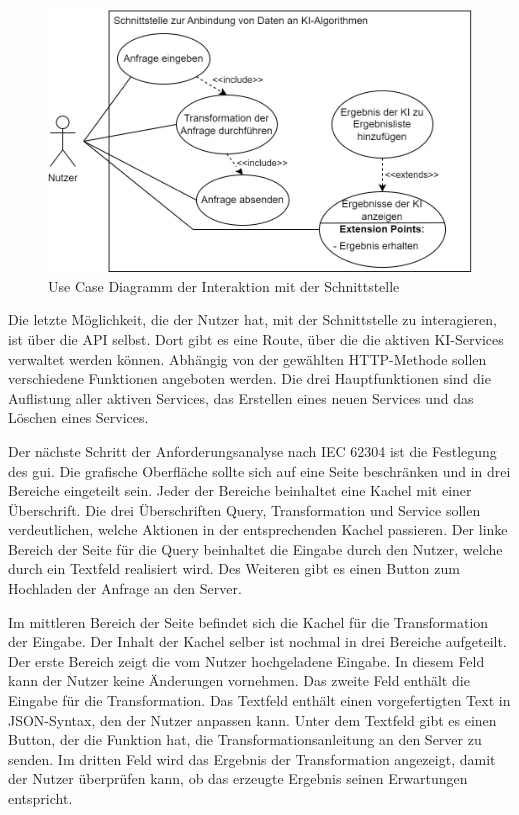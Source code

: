 \begin{figure}[H]
  \centering
    \includegraphics[width = 15cm]{bilder/UseCase}
    \caption{Use Case Diagramm der Interaktion mit der Schnittstelle}
\end{figure}

Die letzte Möglichkeit, die der Nutzer hat, mit der Schnittstelle zu interagieren, ist über die API selbst. Dort gibt es eine Route, über die die aktiven KI-Services verwaltet werden können. Abhängig von der gewählten HTTP-Methode sollen verschiedene Funktionen angeboten werden. Die drei Hauptfunktionen sind die Auflistung aller aktiven Services, das Erstellen eines neuen Services und das Löschen eines Services.

Der nächste Schritt der Anforderungsanalyse nach IEC 62304 ist die Festlegung des \ac{gui}. Die grafische Oberfläche sollte sich auf eine Seite beschränken und in drei Bereiche eingeteilt sein. Jeder der Bereiche beinhaltet eine Kachel mit einer Überschrift. Die drei Überschriften \glqq Query\grqq{}, \glqq Transformation\grqq{} und \glqq Service\grqq{} sollen verdeutlichen, welche Aktionen in der entsprechenden Kachel passieren.
Der linke Bereich der Seite für die Query beinhaltet die Eingabe durch den Nutzer, welche durch ein Textfeld realisiert wird. Des Weiteren gibt es einen Button zum Hochladen der Anfrage an den Server.

Im mittleren Bereich der Seite befindet sich die Kachel für die Transformation der Eingabe. Der Inhalt der Kachel selber ist nochmal in drei Bereiche aufgeteilt. Der erste Bereich zeigt die vom Nutzer hochgeladene Eingabe. In diesem Feld kann der Nutzer keine Änderungen vornehmen. Das zweite Feld enthält die Eingabe für die Transformation. Das Textfeld enthält einen vorgefertigten Text in JSON-Syntax, den der Nutzer anpassen kann. Unter dem Textfeld gibt es einen Button, der die Funktion hat, die Transformationsanleitung an den Server zu senden. Im dritten Feld wird das Ergebnis der Transformation angezeigt, damit der Nutzer überprüfen kann, ob das erzeugte Ergebnis seinen Erwartungen entspricht. 

